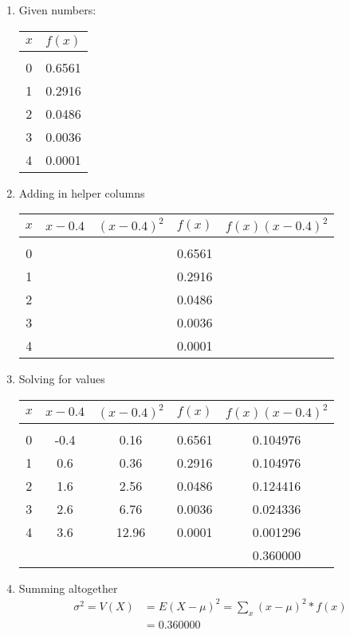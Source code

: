 \documentclass[../INDE315.tex]{subfiles}
\begin{document}
\begin{enumerate}
    \item Given numbers:
        \begin{center}
            \begin{tabular}{c c}
                $x$ & $f(x)$ \\
                \hline \\
                0 & 0.6561 \\
                1 & 0.2916 \\
                2 & 0.0486 \\
                3 & 0.0036 \\
                4 & 0.0001 
            \end{tabular}
        \end{center}
    \item Adding in helper columns
        \begin{center}
            \begin{tabular}{c c c c c}
                $x$ & $x-0.4$ & $(x-0.4)^2$ & $f(x)$ & $f(x) (x-0.4)^2$\\
                \hline \\
                0 & & & 0.6561 & \\
                1 & & & 0.2916 & \\
                2 & & & 0.0486 & \\
                3 & & & 0.0036 & \\
                4 & & & 0.0001 &
            \end{tabular}
        \end{center}
    \item Solving for values
        \begin{center}
            \begin{tabular}{c c c c c}
                $x$ & $x-0.4$ & $(x-0.4)^2$ & $f(x)$ & $f(x) (x-0.4)^2$\\
                \hline \\
                0 & -0.4 & 0.16 & 0.6561 & 0.104976     \\
                1 & 0.6 & 0.36 & 0.2916 &  0.104976     \\
                2 & 1.6 & 2.56 & 0.0486 &  0.124416     \\
                3 & 2.6 & 6.76 & 0.0036 &  0.024336     \\
                4 & 3.6 & 12.96 & 0.0001 & 0.001296     \\
                \hline
                    & & & & 0.360000
            \end{tabular}
        \end{center}
    \item Summing altogether
        \begin{equation*}
            \begin{aligned}
                \sigma ^2 = V(X) &= E(X - \mu)^2 = \sum_x (x - \mu)^2 * f(x) \\
                            &= 0.360000
            \end{aligned}
        \end{equation*}
\end{enumerate}
\end{document}
